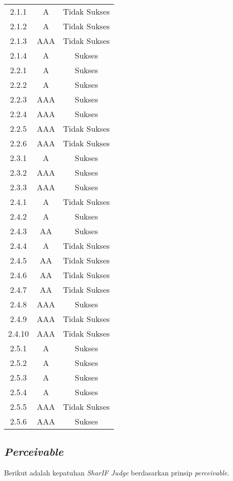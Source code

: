 \begin{center}
\begin{longtable}{|c|c|c|}
		\rowcolor{Pink} 2.1.1 & A & Tidak Sukses\\
		\rowcolor{Pink} 2.1.2 & A & Tidak Sukses\\
		\rowcolor{Red} 2.1.3 & AAA & Tidak Sukses\\
		2.1.4 & A & Sukses\\
		2.2.1 & A & Sukses\\
		2.2.2 & A & Sukses\\
		2.2.3 & AAA & Sukses\\
		2.2.4 & AAA & Sukses\\
		\rowcolor{Red} 2.2.5 & AAA & Tidak Sukses\\
		\rowcolor{Red} 2.2.6 & AAA & Tidak Sukses\\
		2.3.1 & A & Sukses\\
		2.3.2 & AAA & Sukses\\
		2.3.3 & AAA & Sukses\\
		\rowcolor{Pink} 2.4.1 & A & Tidak Sukses\\
		2.4.2 & A & Sukses\\
		2.4.3 & AA & Sukses\\
		\rowcolor{Pink} 2.4.4 & A & Tidak Sukses\\
		\rowcolor{LightRed} 2.4.5 & AA & Tidak Sukses\\
		\rowcolor{LightRed} 2.4.6 & AA & Tidak Sukses\\
		\rowcolor{LightRed} 2.4.7 & AA & Tidak Sukses\\
		2.4.8 & AAA & Sukses\\
		\rowcolor{Red} 2.4.9 & AAA & Tidak Sukses\\
		\rowcolor{Red} 2.4.10 & AAA & Tidak Sukses\\
		2.5.1 & A & Sukses\\
		2.5.2 & A & Sukses\\
		2.5.3 & A & Sukses\\
		2.5.4 & A & Sukses\\
		\rowcolor{Red} 2.5.5 & AAA & Tidak Sukses\\
		2.5.6 & AAA & Sukses\\
	\end{longtable}
\end{center}

\subsection{\textit{Perceivable}}
\label{subsec:kepatuhan_perceivable}

Berikut adalah kepatuhan \textit{SharIF Judge} berdasarkan prinsip \textit{perceivable}.

